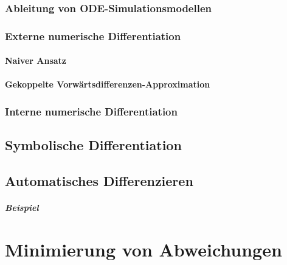         \subsection{Ableitung von ODE-Simulationsmodellen} %

        \subsection{Externe numerische Differentiation} %

            \subsubsection{Naiver Ansatz} %

            \subsubsection{Gekoppelte Vorwärtsdifferenzen-Approximation} %

        \subsection{Interne numerische Differentiation} %

    \section{Symbolische Differentiation} %

    \section{Automatisches Differenzieren} %

        \paragraph{Beispiel} %

\chapter{Minimierung von Abweichungen} %


